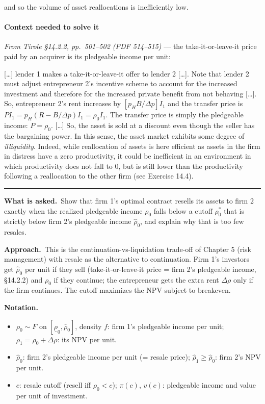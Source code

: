 \documentclass[11pt,a4paper]{article}
\newcommand{\notation}{\par\noindent\textbf{Notation.}}
\newcommand{\asked}{\par\medskip\noindent\textbf{What is asked.}~}
\newcommand{\approach}{\par\smallskip\noindent\textbf{Approach.}~}
\newcommand{\stmtend}{\par\endgroup\nopagebreak\noindent\rule{\linewidth}{0.4pt}\par\medskip}
\begin{document}
and so the volume of asset reallocations is inefficiently low.

\paragraph{Context needed to solve it}

\emph{From Tirole §14.2.2, pp.~501--502 (PDF 514--515)} --- the take-it-or-leave-it price paid by an
acquirer is its pledgeable income per unit:

{[}\ldots{]} lender 1 makes a take-it-or-leave-it offer to lender 2 {[}\ldots{]}. Note that lender 2
must adjust entrepreneur 2's incentive scheme to account for the increased investment and therefore
for the increased private benefit from not behaving {[}\ldots{]}. So, entrepreneur 2's rent
increases by \([p_H B/\Delta p]I_1\) and the transfer price is
\(PI_1 = p_H(R - B/\Delta p)I_1 = \rho_0 I_1\). The transfer price is simply the pledgeable income:
\(P = \rho_0\). {[}\ldots{]} So, the asset is sold at a discount even though the seller has the
bargaining power. In this sense, the asset market exhibits some degree of \emph{illiquidity}.
Indeed, while reallocation of assets is here efficient as assets in the firm in distress have a zero
productivity, it could be inefficient in an environment in which productivity does not fall to 0,
but is still lower than the productivity following a reallocation to the other firm (see Exercise
14.4).
\stmtend

\asked Show that firm 1's optimal contract resells its assets to firm 2 exactly when the realized pledgeable income $\rho_0$ falls below a cutoff $\rho_0^*$ that is strictly below firm 2's pledgeable income $\hat\rho_0$, and explain why that is too few resales.

\approach This is the continuation-vs-liquidation trade-off of Chapter 5 (risk management) with resale as the alternative to continuation. Firm 1's investors get $\hat\rho_0$ per unit if they sell (take-it-or-leave-it price = firm 2's pledgeable income, \S14.2.2) and $\rho_0$ if they continue; the entrepreneur gets the extra rent $\Delta\rho$ only if the firm continues. The cutoff maximizes the NPV subject to breakeven.

\notation
\begin{itemize}
  \item $\rho_0\sim F$ on $[\underline\rho_0,\bar\rho_0]$, density $f$: firm 1's pledgeable income per unit; $\rho_1=\rho_0+\Delta\rho$: its NPV per unit.
  \item $\hat\rho_0$: firm 2's pledgeable income per unit (= resale price); $\hat\rho_1\geq\hat\rho_0$: firm 2's NPV per unit.
  \item $c$: resale cutoff (resell iff $\rho_0<c$); $\pi(c)$, $v(c)$: pledgeable income and value per unit of investment.
\end{itemize}
\end{document}
